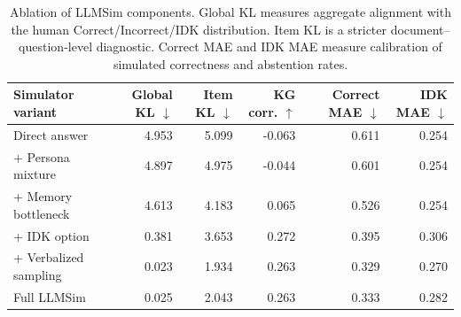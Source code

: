 \begin{table}[t]
\centering
\small
\begin{tabular}{lrrrrr}
\toprule
Simulator variant & Global KL $\downarrow$ & Item KL $\downarrow$ & KG corr. $\uparrow$ & Correct MAE $\downarrow$ & IDK MAE $\downarrow$ \\
\midrule
Direct answer & 4.953 & 5.099 & -0.063 & 0.611 & 0.254 \\
+ Persona mixture & 4.897 & 4.975 & -0.044 & 0.601 & 0.254 \\
+ Memory bottleneck & 4.613 & 4.183 & 0.065 & 0.526 & 0.254 \\
+ IDK option & 0.381 & 3.653 & 0.272 & 0.395 & 0.306 \\
+ Verbalized sampling & 0.023 & 1.934 & 0.263 & 0.329 & 0.270 \\
Full LLMSim & 0.025 & 2.043 & 0.263 & 0.333 & 0.282 \\
\bottomrule
\end{tabular}
\caption{Ablation of LLMSim components. Global KL measures aggregate alignment with the human Correct/Incorrect/IDK distribution. Item KL is a stricter document--question-level diagnostic. Correct MAE and IDK MAE measure calibration of simulated correctness and abstention rates.}
\label{tab:llmsim_ablation}
\end{table}
